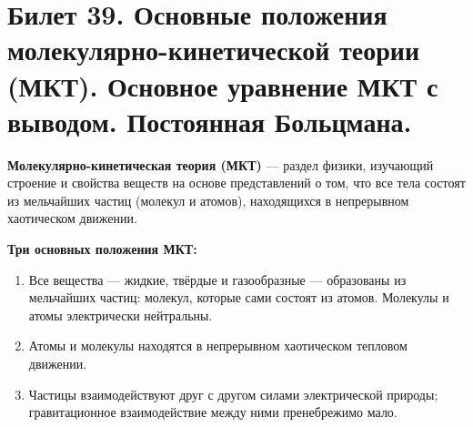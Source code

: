 \section{Билет 39. Основные положения молекулярно-кинетической теории (МКТ). Основное уравнение МКТ с выводом. Постоянная Больцмана.}

\begin{definition}
\textbf{Молекулярно-кинетическая теория (МКТ)} --- раздел физики, изучающий строение и свойства веществ на основе представлений о том, что все тела состоят из мельчайших частиц (молекул и атомов), находящихся в непрерывном хаотическом движении.
\par\noindent\textbf{Три основных положения МКТ:}
\begin{enumerate}
    \item Все вещества --- жидкие, твёрдые и газообразные --- образованы из мельчайших частиц: молекул, которые сами состоят из атомов. Молекулы и атомы электрически нейтральны.
    \item Атомы и молекулы находятся в непрерывном хаотическом тепловом движении.
    \item Частицы взаимодействуют друг с другом силами электрической природы; гравитационное взаимодействие между ними пренебрежимо мало.
\end{enumerate}
\end{definition}

